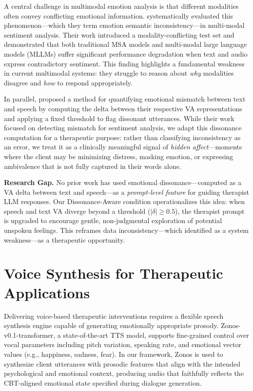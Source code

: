 A central challenge in multimodal emotion analysis is that different modalities often convey conflicting emotional information. \cite{wang2024evaluationdatainconsistencymultimodal} systematically evaluated this phenomenon---which they term emotion semantic inconsistency---in multi-modal sentiment analysis. Their work introduced a modality-conflicting test set and demonstrated that both traditional MSA models and multi-modal large language models (MLLMs) suffer significant performance degradation when text and audio express contradictory sentiment. This finding highlights a fundamental weakness in current multimodal systems: they struggle to reason about \emph{why} modalities disagree and \emph{how} to respond appropriately.

In parallel, \cite{haydarov-etal-2025-towards} proposed a method for quantifying emotional mismatch between text and speech by computing the delta between their respective VA representations and applying a fixed threshold to flag dissonant utterances. While their work focused on detecting mismatch for sentiment analysis, we adapt this dissonance computation for a therapeutic purpose: rather than classifying inconsistency as an error, we treat it as a clinically meaningful signal of \emph{hidden affect}---moments where the client may be minimizing distress, masking emotion, or expressing ambivalence that is not fully captured in their words alone.

\textbf{Research Gap.} No prior work has used emotional dissonance---computed as a VA delta between text and speech---as a \emph{prompt-level feature} for guiding therapist LLM responses. Our Dissonance-Aware condition operationalizes this idea: when speech and text VA diverge beyond a threshold ($|\delta| \geq 0.5$), the therapist prompt is upgraded to encourage gentle, non-judgmental exploration of potential unspoken feelings. This reframes data inconsistency---which \cite{wang2024evaluationdatainconsistencymultimodal} identified as a system weakness---as a therapeutic opportunity.

\section{Voice Synthesis for Therapeutic Applications}

Delivering voice-based therapeutic interventions requires a flexible speech synthesis engine capable of generating emotionally appropriate prosody. Zonos-v0.1-transformer, a state-of-the-art TTS model, supports fine-grained control over vocal parameters including pitch variation, speaking rate, and emotional vector values (e.g., happiness, sadness, fear). In our framework, Zonos is used to synthesize client utterances with prosodic features that align with the intended psychological and emotional context, producing audio that faithfully reflects the CBT-aligned emotional state specified during dialogue generation.

